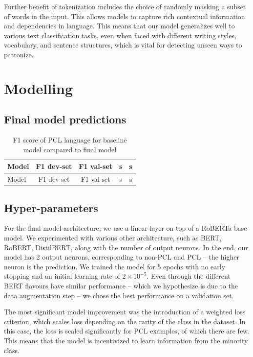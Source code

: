 \documentclass[11pt,a4paper]{article}
\begin{document}
Further benefit of tokenization includes the choice of randomly masking a subset of words in the input. This allows models to capture rich contextual information and dependencies in language. This means that our model generalizes well to various text classification tasks, even when faced with different writing styles, vocabulary, and sentence structures, which is vital for detecting unseen ways to patronize.

\section{Modelling}\label{sect:model}

\subsection{Final model predictions}
\begin{table}[!h]
    \centering
    \begin{tabular}{|l||c|c|c|c|}
        \hline
        Model & F1 dev-set & F1 val-set & s & s\\
        \hline
        \hline
        Model & F1 dev-set & F1 val-set & s & s \\
        \hline
    \end{tabular}
    \caption{F1 score of PCL language for baseline model compared to final model}    
\end{table}

\subsection{Hyper-parameters}
For the final model architecture, we use a linear layer on top of a RoBERTa base model. We experimented with various other architecture, such as BERT, RoBERT, DistilBERT, along with the number of output neurons. In the end, our model has 2 output neurons, corresponding to non-PCL and PCL -- the higher neuron is the prediction. We trained the model for 5 epochs with no early stopping and an initial learning rate of $2 \times 10^{-5}$. Even through the different BERT flavours have similar performance -- which we hypothesize is due to the data augmentation step -- we chose the best performance on a validation set.

The most significant model improvement was the introduction of a weighted loss criterion, which scales loss depending on the rarity of the class in the dataset. In this case, the loss is scaled significantly for PCL examples, of which there are few. This means that the model is incentivized to learn information from the minority class.
\end{document}
